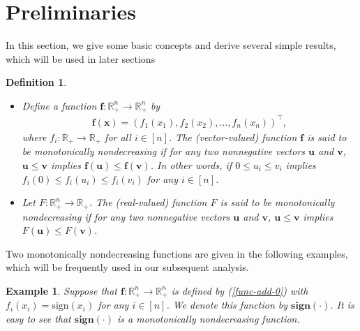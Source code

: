 \documentclass[12pt]{article}
\newtheorem{Definition}{Definition}[part]
\newtheorem{Example}{Example}[part]
\begin{document}
\section{Preliminaries}
\setcounter{equation}{0} \setcounter{Assumption}{0}
\setcounter{Theorem}{0} \setcounter{Proposition}{0}
\setcounter{Corollary}{0} \setcounter{Lemma}{0}
\setcounter{Definition}{0} \setcounter{Remark}{0}
\setcounter{Algorithm}{0}

\hspace{4mm} In this section, we give some basic concepts and derive several simple results, which will be used in later sections
\begin{Definition}\label{def-nondecreasing-vector-valued function}
\begin{itemize}
\item[(i)] Define a function $\mathbf{f}: \mathbb{R}^n_{+}\rightarrow\mathbb{R}^n_+$ by
\begin{eqnarray}\label{func-add-0}
\mathbf{f}(\mathbf{x})=(f_1(x_1),f_2(x_2),\ldots, f_n(x_n))^{\top},
\end{eqnarray}
where $f_i:\mathbb{R}_+\rightarrow \mathbb{R}_+$ for all $i\in[n]$. The (vector-valued) function $\mathbf{f}$ is said to be monotonically nondecreasing if for any two nonnegative vectors $\mathbf{u}$ and $\mathbf{v}$, $\mathbf{u}\leqslant\mathbf{v}$ implies $\mathbf{f}(\mathbf{u})\leqslant\mathbf{f}(\mathbf{v})$.  In other words, if $0\leqslant u_i\leqslant v_i$ implies $f_i(0)\leqslant f_i(u_i)\leqslant f_i(v_i)$ for any $i\in [n]$.
\item[(ii)] Let $F: \mathbb{R}^n_{+}\rightarrow\mathbb{R}_+$. The (real-valued) function $F$ is said to be monotonically nondecreasing if for any two nonnegative vectors $\mathbf{u}$ and $\mathbf{v}$, $\mathbf{u}\leqslant\mathbf{v}$ implies $F(\mathbf{u})\leqslant F(\mathbf{v})$.
\end{itemize}
\end{Definition}

Two monotonically nondecreasing functions are given in the following examples, which will be frequently used in our subsequent analysis.

\begin{Example}\label{on-sign-fun}
Suppose that $\mathbf{f}: \mathbb{R}^n_{+}\rightarrow\mathbb{R}^n_+$ is defined by (\ref{func-add-0}) with $f_i(x_i)=\textrm{sign}(x_i)$ for any $i\in[n]$. We denote this function by $\mathbf{sign}(\mathbf{\cdot})$. It is easy to see that
$\mathbf{sign}(\mathbf{\cdot})$ is a monotonically nondecreasing function.
\end{Example}
\end{document}
